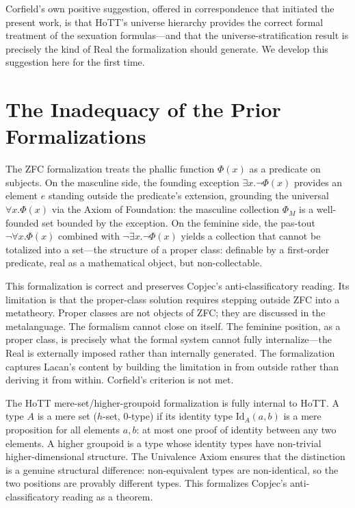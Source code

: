 \documentclass[12pt]{article}
\theoremstyle{definition}
\theoremstyle{remark}
\begin{document}
Corfield's own positive suggestion, offered in correspondence that initiated the present work, is that HoTT's universe hierarchy provides the correct formal treatment of the sexuation formulas---and that the universe-stratification result is precisely the kind of Real the formalization should generate. We develop this suggestion here for the first time.

\section{The Inadequacy of the Prior Formalizations}

The ZFC formalization treats the phallic function $\Phi(x)$ as a predicate on subjects. On the masculine side, the founding exception $\exists x.\lnot\Phi(x)$ provides an element $e$ standing outside the predicate's extension, grounding the universal $\forall x.\Phi(x)$ via the Axiom of Foundation: the masculine collection $\Phi_M$ is a well-founded set bounded by the exception. On the feminine side, the pas-tout $\lnot\forall x.\Phi(x)$ combined with $\lnot\exists x.\lnot\Phi(x)$ yields a collection that cannot be totalized into a set---the structure of a proper class: definable by a first-order predicate, real as a mathematical object, but non-collectable.

This formalization is correct and preserves Copjec's anti-classificatory reading. Its limitation is that the proper-class solution requires stepping outside ZFC into a metatheory. Proper classes are not objects of ZFC; they are discussed in the metalanguage. The formalism cannot close on itself. The feminine position, as a proper class, is precisely what the formal system cannot fully internalize---the Real is externally imposed rather than internally generated. The formalization captures Lacan's content by building the limitation in from outside rather than deriving it from within. Corfield's criterion is not met.

The HoTT mere-set/higher-groupoid formalization is fully internal to HoTT. A type $A$ is a mere set ($h$-set, $0$-type) if its identity type $\mathrm{Id}_A(a, b)$ is a mere proposition for all elements $a, b$: at most one proof of identity between any two elements. A higher groupoid is a type whose identity types have non-trivial higher-dimensional structure. The Univalence Axiom ensures that the distinction is a genuine structural difference: non-equivalent types are non-identical, so the two positions are provably different types. This formalizes Copjec's anti-classificatory reading as a theorem.
\end{document}
